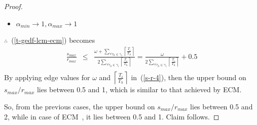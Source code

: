 \documentclass[conference]{IEEEtran}
\begin{document}
\begin{proof}
\begin{itemize}
\item $\alpha_{min} \rightarrow 1, \alpha_{max} \rightarrow 1$
\end{itemize}
$\therefore$~(\ref{t-gedf-lcm-ecm}) becomes
\begin{eqnarray}
\frac{s_{max}}{r_{max}}& \le & \frac{\omega+\sum_{\forall \tau_h \in \gamma_i}\left\lceil\frac{T_i}{T_h}\right\rceil}{2\sum_{\forall \tau_h \in \gamma_i}\left\lceil\frac{T_i}{T_h}\right\rceil} = \frac{\omega}{2\sum_{\forall \tau_h \in \gamma_i}\left\lceil\frac{T_i}{T_h}\right\rceil}+0.5\nonumber\\
\label{s-r-4}\end{eqnarray}
By applying edge values for $\omega$ and $\left\lceil\frac{T_i}{T_h}\right\rceil$ in~(\ref{s-r-4}), then the upper bound on $s_{max}/r_{max}$ lies between 0.5 and 1, which is similar to that achieved by ECM.

So, from the previous cases, the upper bound on $s_{max}/r_{max}$ lies between 0.5 and 2, while in case of ECM~\cite{stmconcurrencycontrol:emsoft11}, it lies between 0.5 and 1. Claim follows.

\end{proof}
\end{document}
